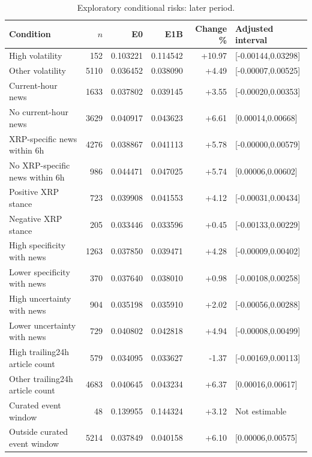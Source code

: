\begin{table}[htbp]\centering\small
\caption{Exploratory conditional risks: later period.}\label{tab:conditionallater}
\begin{tabular}{p{.30\linewidth}rrrrp{.22\linewidth}}\toprule
Condition & $n$ & E0 & E1B & Change \% & Adjusted interval\\\midrule
High volatility & 152 & 0.103221 & 0.114542 & +10.97 & [-0.00144,0.03298]\\
Other volatility & 5110 & 0.036452 & 0.038090 & +4.49 & [-0.00007,0.00525]\\
Current-hour news & 1633 & 0.037802 & 0.039145 & +3.55 & [-0.00020,0.00353]\\
No current-hour news & 3629 & 0.040917 & 0.043623 & +6.61 & [0.00014,0.00668]\\
XRP-specific news within 6h & 4276 & 0.038867 & 0.041113 & +5.78 & [-0.00000,0.00579]\\
No XRP-specific news within 6h & 986 & 0.044471 & 0.047025 & +5.74 & [0.00006,0.00602]\\
Positive XRP stance & 723 & 0.039908 & 0.041553 & +4.12 & [-0.00031,0.00434]\\
Negative XRP stance & 205 & 0.033446 & 0.033596 & +0.45 & [-0.00133,0.00229]\\
High specificity with news & 1263 & 0.037850 & 0.039471 & +4.28 & [-0.00009,0.00402]\\
Lower specificity with news & 370 & 0.037640 & 0.038010 & +0.98 & [-0.00108,0.00258]\\
High uncertainty with news & 904 & 0.035198 & 0.035910 & +2.02 & [-0.00056,0.00288]\\
Lower uncertainty with news & 729 & 0.040802 & 0.042818 & +4.94 & [-0.00008,0.00499]\\
High trailing24h article count & 579 & 0.034095 & 0.033627 & -1.37 & [-0.00169,0.00113]\\
Other trailing24h article count & 4683 & 0.040645 & 0.043234 & +6.37 & [0.00016,0.00617]\\
Curated event window & 48 & 0.139955 & 0.144324 & +3.12 & Not estimable\\
Outside curated event window & 5214 & 0.037849 & 0.040158 & +6.10 & [0.00006,0.00575]\\\bottomrule\end{tabular}
\end{table}


